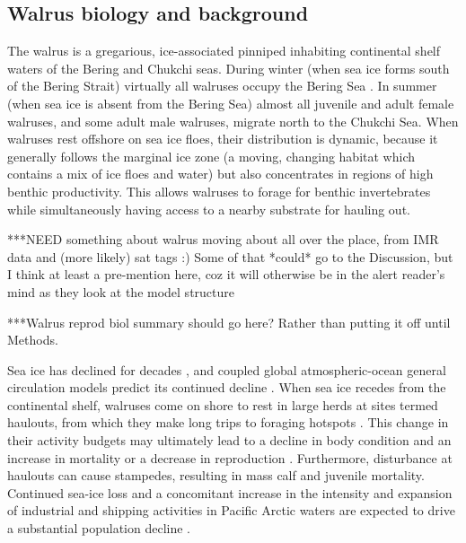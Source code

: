 \subsection{Walrus biology and background}

The walrus is a gregarious, ice-associated pinniped inhabiting continental
shelf waters of the Bering and Chukchi seas. During winter (when sea
ice forms south of the Bering Strait) virtually all walruses occupy
the Bering Sea \citep{fay_ecology_1982}. In summer (when sea ice
is absent from the Bering Sea) almost all juvenile and adult female
walruses, and some adult male walruses, migrate north to the Chukchi
Sea. When walruses rest offshore on sea ice floes, their distribution
is dynamic, because it generally follows the marginal ice zone (a
moving, changing habitat which contains a mix of ice floes and water)
but also concentrates in regions of high benthic productivity. This
allows walruses to forage for benthic invertebrates while simultaneously
having access to a nearby substrate for hauling out.

{*}{*}{*}NEED something about walrus moving about all over the place,
from IMR data and (more likely) sat tags :) Some of that {*}could{*}
go to the Discussion, but I think at least a pre-mention here, coz
it will otherwise be in the alert reader's mind as they look at the
model structure

{*}{*}{*}Walrus reprod biol summary should go here? Rather than putting
it off until Methods.

Sea ice has declined for decades \citep{perovich_loss_2009,stroeve_trends_2012,stroeve_changing_2018},
and coupled global atmospheric-ocean general circulation models predict
its continued decline \citep{arthun_seasonal_2021}. When sea ice
recedes from the continental shelf, walruses come on shore to rest
in large herds at sites termed haulouts, from which they make long
trips to foraging hotspots \citep{jay_walrus_2012}. This change in
their activity budgets \citep{jay_walrus_2017} may ultimately lead
to a decline in body condition and an increase in mortality or a decrease
in reproduction \citep{udevitz_forecasting_2017}. Furthermore, disturbance
at haulouts can cause stampedes, resulting in mass calf and juvenile
mortality. Continued sea-ice loss and a concomitant increase in the
intensity and expansion of industrial and shipping activities in Pacific
Arctic waters \citep{silber_vessel_2019} are expected to drive a
substantial population decline \citep{garlich-miller_status_2011,maccracken_final_2017,johnson_assessing_2023,johnson_assessing_2024}.

